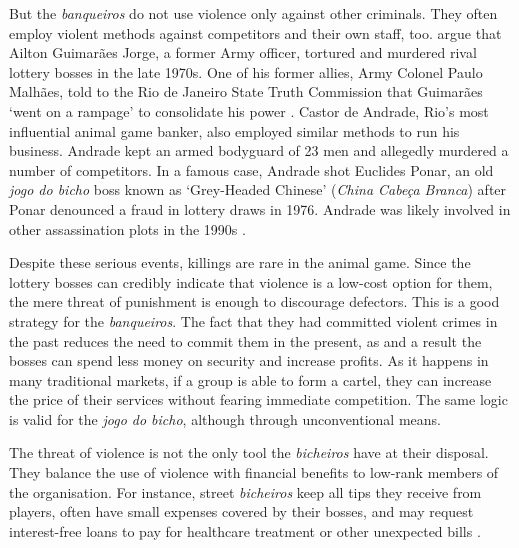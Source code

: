 \documentclass[a4paper,12pt]{article}
\begin{document}
But the \textit{banqueiros} do not use violence only against other criminals. They often employ violent methods against competitors and their own staff, too. \citet{jupiara2015poroes} argue that Ailton Guimarães Jorge, a former Army officer, tortured and murdered rival lottery bosses in the late 1970s. One of his former allies, Army Colonel Paulo Malhães, told to the Rio de Janeiro State Truth Commission that Guimarães `went on a rampage' to consolidate his power \citep{belem2015guimaraes}. Castor de Andrade, Rio's most influential animal game banker, also employed similar methods to run his business. Andrade kept an armed bodyguard of 23 men and allegedly murdered a number of competitors. In a famous case, Andrade shot Euclides Ponar, an old \textit{jogo do bicho} boss known as `Grey-Headed Chinese' (\textit{China Cabe\c{c}a Branca}) after Ponar denounced a fraud in lottery draws in 1976. Andrade was likely involved in other assassination plots in the 1990s  \citep{globo2017castor}. 

Despite these serious events, killings are rare in the animal game. Since the lottery bosses can credibly indicate that violence is a low-cost option for them, the mere threat of punishment is enough to discourage defectors. This is a good strategy for the \textit{banqueiros}. The fact that they had committed violent crimes in the past reduces the need to commit them in the present, as and a result the bosses can spend less money on security and increase profits. As it happens in many traditional markets, if a group is able to form a cartel, they can increase the price of their services without fearing immediate competition. The same logic is valid for the \textit{jogo do bicho}, although through unconventional means.  

The threat of violence is not the only tool the \textit{bicheiros} have at their disposal. They balance the use of violence with financial benefits to low-rank members of the organisation. For instance, street \textit{bicheiros} keep all tips they receive from players, often have small expenses covered by their bosses, and may request interest-free loans to pay for healthcare treatment or other unexpected bills \citep{labronici2012paratodos}.
\end{document}
